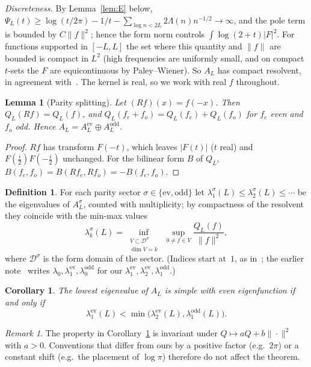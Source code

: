 \documentclass[11pt]{amsart}
\newcommand{\ev}{\mathrm{ev}}
\newcommand{\od}{\mathrm{odd}}
\newtheorem{lemma}[theorem]{Lemma}
\newtheorem{corollary}[theorem]{Corollary}
\theoremstyle{definition}
\newtheorem{definition}[theorem]{Definition}
\theoremstyle{remark}
\newtheorem{remark}[theorem]{Remark}
\numberwithin{equation}{section}
\begin{document}
\emph{Discreteness.} By Lemma~\ref{lem:E} below, $\Psi_L(t)\ge\log(t/2\pi)-1/t-\sum_{\log n<2L}2\Lambda(n)n^{-1/2}\to\infty$, and the pole term is bounded by $C\|f\|^2$; hence the form norm controls $\int\log(2+t)|F|^2$. For functions supported in $[-L,L]$ the set where this quantity and $\|f\|$ are bounded is compact in $L^2$ (high frequencies are uniformly small, and on compact $t$-sets the $F$ are equicontinuous by Paley--Wiener). So $A_L$ has compact resolvent, in agreement with~\cite[Thm.~3.6]{CCM25}. The kernel is real, so we work with real $f$ throughout.

\begin{lemma}[Parity splitting]\label{lem:parity}
Let $(Rf)(x)=f(-x)$. Then $Q_L(Rf)=Q_L(f)$, and $Q_L(f_e+f_o)=Q_L(f_e)+Q_L(f_o)$ for $f_e$ even and $f_o$ odd. Hence $A_L=A_L^{\ev}\oplus A_L^{\od}$.
\end{lemma}
\begin{proof}
$Rf$ has transform $F(-t)$, which leaves $|F(t)|$ ($t$ real) and $F(\tfrac i2)F(-\tfrac i2)$ unchanged. For the bilinear form $B$ of $Q_L$, $B(f_e,f_o)=B(Rf_e,Rf_o)=-B(f_e,f_o)$.
\end{proof}

\begin{definition}
For each parity sector $\sigma\in\{\ev,\od\}$ let $\lambda_1^\sigma(L)\le\lambda_2^\sigma(L)\le\cdots$ be the eigenvalues of $A_L^\sigma$, counted with multiplicity; by compactness of the resolvent they coincide with the min-max values
\[
\lambda_k^\sigma(L)=\inf_{\substack{V\subset\mathcal D^\sigma\\ \dim V=k}}\ \sup_{0\ne f\in V}\frac{Q_L(f)}{\|f\|^2},
\]
where $\mathcal D^\sigma$ is the form domain of the sector. (Indices start at~$1$, as in~\cite{Zhu,Elston}; the earlier note~\cite{Botha} writes $\lambda_0,\lambda_1^{\ev},\lambda_0^{\od}$ for our $\lambda_1^\ev,\lambda_2^\ev,\lambda_1^\od$.)
\end{definition}

\begin{corollary}\label{cor:criterion}
The lowest eigenvalue of $A_L$ is simple with even eigenfunction if and only if
\[
\lambda_1^\ev(L)<\min\bigl(\lambda_2^\ev(L),\lambda_1^\od(L)\bigr).
\]
\end{corollary}

\begin{remark}\label{rem:affine}
The property in Corollary~\ref{cor:criterion} is invariant under $Q\mapsto aQ+b\|\cdot\|^2$ with $a>0$. Conventions that differ from ours by a positive factor (e.g.\ $2\pi$) or a constant shift (e.g.\ the placement of $\log\pi$) therefore do not affect the theorem.
\end{remark}
\end{document}
